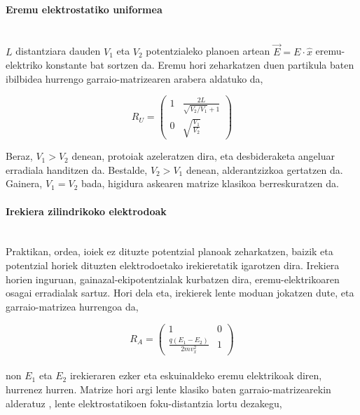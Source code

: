 \documentclass[12pt]{article}
\numberwithin{figure}{section}
\numberwithin{equation}{section}
\begin{document}
\paragraph{Eremu elektrostatiko uniformea}\leavevmode\\

$L$ distantziara dauden $V_1$ eta $V_2$ potentzialeko planoen artean $\vec{E}=E\cdot \hat{x}$ eremu-elektriko konstante bat sortzen da. Eremu hori zeharkatzen duen partikula baten ibilbidea hurrengo garraio-matrizearen arabera aldatuko da,

\begin{equation}
\boxed{
    R_U = \begin{pmatrix}
            1 & \frac{2L}{\sqrt{V_2/V_1}+1}\\
            0 & \sqrt{\frac{V_1}{V_2}}
    \end{pmatrix}
}
\end{equation}

Beraz, $V_1>V_2$ denean, protoiak azeleratzen dira, eta desbideraketa angeluar erradiala handitzen da. Bestalde, $V_2>V_1$ denean, alderantzizkoa gertatzen da. Gainera, $V_1=V_2$ bada, higidura askearen matrize klasikoa berreskuratzen da.

\paragraph{Irekiera zilindrikoko elektrodoak}\leavevmode\\

Praktikan, ordea, ioiek ez dituzte potentzial planoak zeharkatzen, baizik eta potentzial horiek dituzten elektrodoetako irekieretatik igarotzen dira. Irekiera horien inguruan, gainazal-ekipotentzialak kurbatzen dira, eremu-elektrikoaren osagai erradialak sartuz. Hori dela eta, irekierek lente moduan jokatzen dute, eta garraio\hyp{}matrizea hurrengoa da,

\begin{equation}
\boxed{
    R_A = \begin{pmatrix}
            1 & 0\\
            \frac{q(E_1-E_2)}{2mv_x^2} & 1
    \end{pmatrix}
}
\end{equation}
\\
non $E_1$ eta $E_2$ irekieraren ezker eta eskuinaldeko eremu elektrikoak diren, hurrenez hurren. Matrize hori argi lente klasiko baten garraio-matrizearekin alderatuz \cite{liebl_applied_2008}, lente elektrostatikoen foku-distantzia lortu dezakegu,
\end{document}
